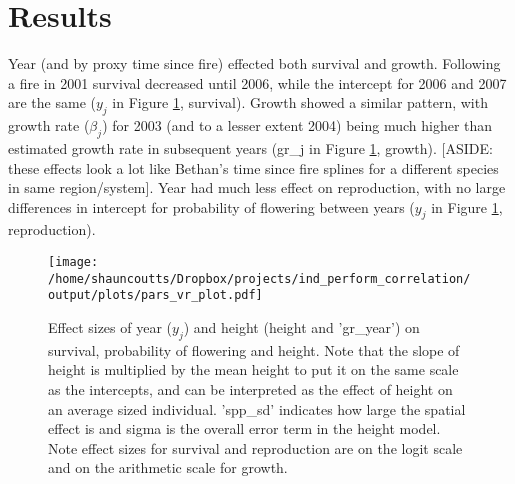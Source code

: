 \documentclass[12pt,a4paper]{article}
\begin{document}
\section*{Results}
Year (and by proxy time since fire) effected both survival and growth. Following a fire in 2001 survival decreased until 2006, while the intercept for 2006 and 2007 are the same ($y_j$ in Figure \ref{fig:effect_size}, survival). Growth showed a similar pattern, with growth rate ($\beta_j$) for 2003 (and to a lesser extent 2004) being much higher than estimated growth rate in subsequent years (gr\_j in Figure \ref{fig:effect_size}, growth). [ASIDE: these effects look a lot like Bethan's time since fire splines for a different species in same region/system]. Year had much less effect on reproduction, with no large differences in intercept for probability of flowering between years ($y_j$ in Figure \ref{fig:effect_size}, reproduction).     


\begin{figure}[!h] 
	\texttt{[image: /home/shauncoutts/Dropbox/projects/ind\_perform\_correlation/output/plots/pars\_vr\_plot.pdf]}
\caption{Effect sizes of year ($y_j$) and height (height and 'gr\_year') on survival, probability of flowering and height. Note that the slope of height is multiplied by the mean height to put it on the same scale as the intercepts, and can be interpreted as the effect of height on an average sized individual. 'spp\_sd' indicates how large the spatial effect is and sigma is the overall error term in the height model. Note effect sizes for survival and reproduction are on the logit scale and on the arithmetic scale for growth.} 
\label{fig:effect_size}
\end{figure}
\end{document}
